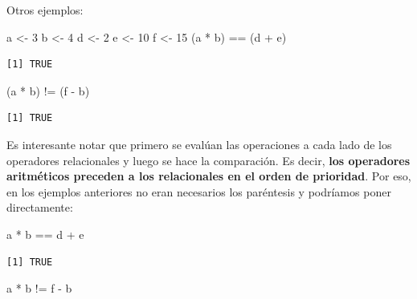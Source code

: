 \documentclass[
]{book}
\newenvironment{Shaded}{\begin{snugshade}}{\end{snugshade}}
\newcommand{\DecValTok}[1]{\textcolor[rgb]{0.00,0.00,0.81}{#1}}
\newcommand{\NormalTok}[1]{#1}
\newcommand{\OtherTok}[1]{\textcolor[rgb]{0.56,0.35,0.01}{#1}}
\newcommand{\SpecialCharTok}[1]{\textcolor[rgb]{0.00,0.00,0.00}{#1}}
\begin{document}
Otros ejemplos:

\begin{Shaded}
\begin{Highlighting}[]
\NormalTok{a }\OtherTok{\textless{}{-}} \DecValTok{3}
\NormalTok{b }\OtherTok{\textless{}{-}} \DecValTok{4}
\NormalTok{d }\OtherTok{\textless{}{-}} \DecValTok{2}
\NormalTok{e }\OtherTok{\textless{}{-}} \DecValTok{10}
\NormalTok{f }\OtherTok{\textless{}{-}} \DecValTok{15}
\NormalTok{(a }\SpecialCharTok{*}\NormalTok{ b) }\SpecialCharTok{==}\NormalTok{ (d }\SpecialCharTok{+}\NormalTok{ e)}
\end{Highlighting}
\end{Shaded}

\begin{verbatim}
[1] TRUE
\end{verbatim}

\begin{Shaded}
\begin{Highlighting}[]
\NormalTok{(a }\SpecialCharTok{*}\NormalTok{ b) }\SpecialCharTok{!=}\NormalTok{ (f }\SpecialCharTok{{-}}\NormalTok{ b)}
\end{Highlighting}
\end{Shaded}

\begin{verbatim}
[1] TRUE
\end{verbatim}

Es interesante notar que primero se evalúan las operaciones a cada lado de los operadores relacionales y luego se hace la comparación. Es decir, \textbf{los operadores aritméticos preceden a los relacionales en el orden de prioridad}. Por eso, en los ejemplos anteriores no eran necesarios los paréntesis y podríamos poner directamente:

\begin{Shaded}
\begin{Highlighting}[]
\NormalTok{a }\SpecialCharTok{*}\NormalTok{ b }\SpecialCharTok{==}\NormalTok{ d }\SpecialCharTok{+}\NormalTok{ e}
\end{Highlighting}
\end{Shaded}

\begin{verbatim}
[1] TRUE
\end{verbatim}

\begin{Shaded}
\begin{Highlighting}[]
\NormalTok{a }\SpecialCharTok{*}\NormalTok{ b }\SpecialCharTok{!=}\NormalTok{ f }\SpecialCharTok{{-}}\NormalTok{ b}
\end{Highlighting}
\end{Shaded}
\end{document}
